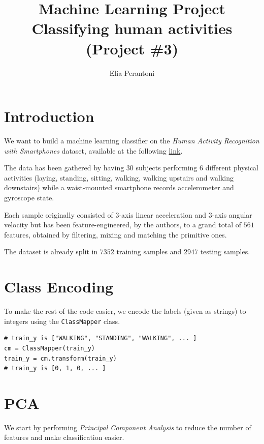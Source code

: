 \documentclass[14pt]{extarticle}
\begin{document}
    \author{Elia Perantoni}
    \title{ Machine Learning Project \\
        \large Classifying human activities \\
        (Project \#3) }
    \maketitle

    \section{Introduction}
    We want to build a machine learning classifier on the \emph{Human Activity
    Recognition with Smartphones} dataset, available at the following
    \href{https://www.kaggle.com/datasets/uciml/human-activity-recognition-with-smartphones}{link}.

    The data has been gathered by having $30$ subjects performing $6$ different
    physical activities (laying, standing, sitting, walking, walking upstairs
    and walking downstairs) while a waist-mounted smartphone records
    accelerometer and gyroscope state.

    Each sample originally consisted of $3$-axis linear acceleration and
    $3$-axis angular velocity but has been feature-engineered, by the authors,
    to a grand total of $561$ features, obtained by filtering, mixing and
    matching the primitive ones.

    The dataset is already split in $7352$ training samples and $2947$ testing
    samples.

    \section{Class Encoding}
    To make the rest of the code easier, we encode the labels (given as strings)
    to integers using the \texttt{ClassMapper} class.

    \begin{verbatim}
# train_y is ["WALKING", "STANDING", "WALKING", ... ]
cm = ClassMapper(train_y)
train_y = cm.transform(train_y)
# train_y is [0, 1, 0, ... ]
    \end{verbatim}

    \section{PCA}
    We start by performing \emph{Principal Component Analysis} to reduce the
    number of features and make classification easier.
\end{document}
